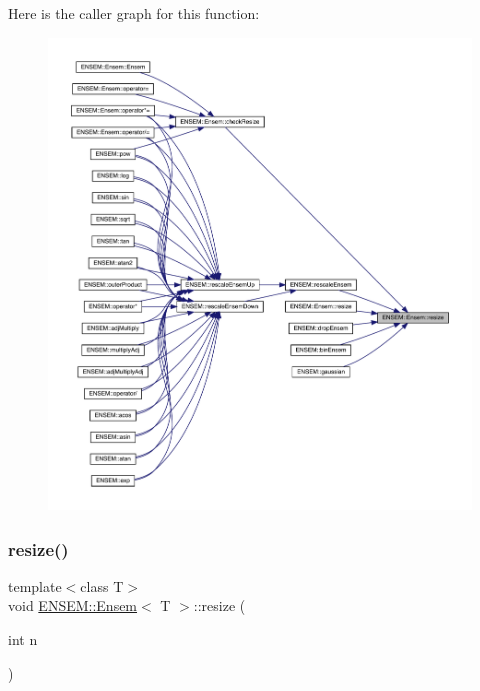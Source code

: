 Here is the caller graph for this function\+:\nopagebreak
\begin{figure}[H]
\begin{center}
\leavevmode
\includegraphics[width=350pt]{d7/d3e/classENSEM_1_1Ensem_ae43aa68aaca92143baffe83310657f4a_icgraph}
\end{center}
\end{figure}
\mbox{\label{classENSEM_1_1Ensem_ae43aa68aaca92143baffe83310657f4a}} 
\subsubsection{\texorpdfstring{resize()}{resize()}\hspace{0.1cm}{\footnotesize\ttfamily [2/4]}}
{\footnotesize\ttfamily template$<$class T$>$ \\
void \mbox{\hyperlink{classENSEM_1_1Ensem}{E\+N\+S\+E\+M\+::\+Ensem}}$<$ T $>$\+::resize (\begin{DoxyParamCaption}\item[{int}]{n }\end{DoxyParamCaption})\hspace{0.3cm}{\ttfamily [inline]}}



